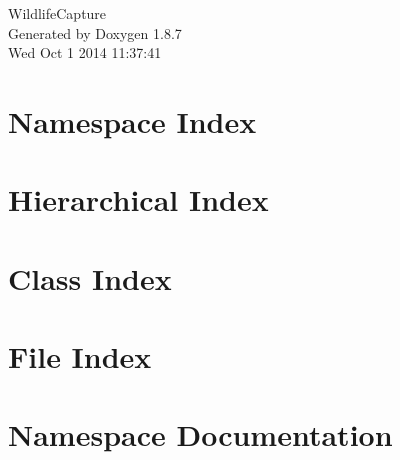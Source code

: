 \documentclass[twoside]{book}
\newcommand{\+}{\discretionary{\mbox{\scriptsize$\hookleftarrow$}}{}{}}
\newcommand{\clearemptydoublepage}{%
  \newpage{\pagestyle{empty}\cleardoublepage}%
}
\begin{document}
\begin{titlepage}
\vspace*{7cm}
\begin{center}%
{\Large Wildlife\+Capture }\\
\vspace*{1cm}
{\large Generated by Doxygen 1.8.7}\\
\vspace*{0.5cm}
{\small Wed Oct 1 2014 11:37:41}\\
\end{center}
\end{titlepage}
\clearemptydoublepage
\tableofcontents
\clearemptydoublepage
{}

\chapter{Namespace Index}

\chapter{Hierarchical Index}

\chapter{Class Index}

\chapter{File Index}

\chapter{Namespace Documentation}



\end{document}
